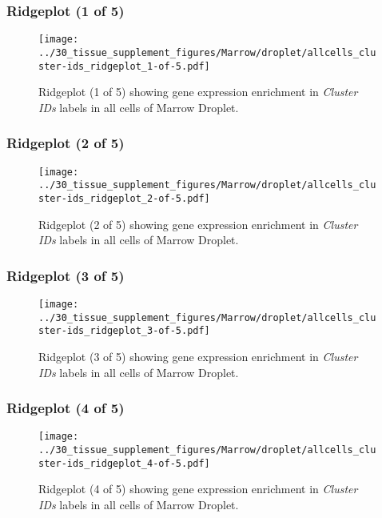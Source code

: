 \clearpage

\subsubsection{Ridgeplot (1 of 5)}
\begin{figure}[h]
\centering
\texttt{[image: ../30\_tissue\_supplement\_figures/Marrow/droplet/allcells\_cluster-ids\_ridgeplot\_1-of-5.pdf]}

\caption{ Ridgeplot (1 of 5)  showing gene expression enrichment in \emph{Cluster IDs} labels in all cells of Marrow Droplet. }
\end{figure}


\clearpage

\subsubsection{Ridgeplot (2 of 5)}
\begin{figure}[h]
\centering
\texttt{[image: ../30\_tissue\_supplement\_figures/Marrow/droplet/allcells\_cluster-ids\_ridgeplot\_2-of-5.pdf]}

\caption{ Ridgeplot (2 of 5)  showing gene expression enrichment in \emph{Cluster IDs} labels in all cells of Marrow Droplet. }
\end{figure}


\clearpage

\subsubsection{Ridgeplot (3 of 5)}
\begin{figure}[h]
\centering
\texttt{[image: ../30\_tissue\_supplement\_figures/Marrow/droplet/allcells\_cluster-ids\_ridgeplot\_3-of-5.pdf]}

\caption{ Ridgeplot (3 of 5)  showing gene expression enrichment in \emph{Cluster IDs} labels in all cells of Marrow Droplet. }
\end{figure}


\clearpage

\subsubsection{Ridgeplot (4 of 5)}
\begin{figure}[h]
\centering
\texttt{[image: ../30\_tissue\_supplement\_figures/Marrow/droplet/allcells\_cluster-ids\_ridgeplot\_4-of-5.pdf]}

\caption{ Ridgeplot (4 of 5)  showing gene expression enrichment in \emph{Cluster IDs} labels in all cells of Marrow Droplet. }
\end{figure}


